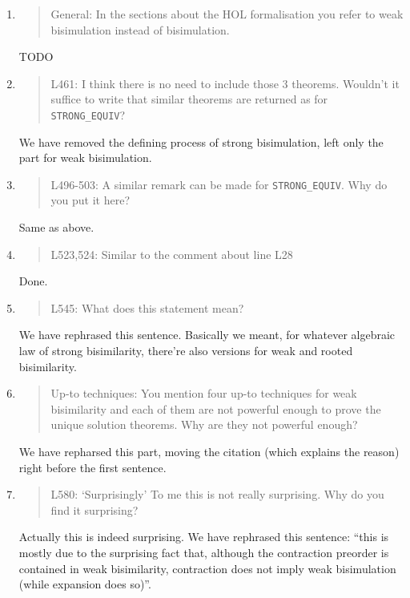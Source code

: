 \begin{enumerate}
\item \begin{quote}
    General: In the sections about the HOL formalisation you refer to
    weak bisimulation instead of bisimulation.    
  \end{quote}
  TODO
  
\item \begin{quote}
    L461: I think there is no need to include those 3
    theorems. Wouldn’t it suffice to write that similar theorems are
    returned as for \texttt{STRONG\_EQUIV}?
  \end{quote}
  We have removed the defining process of strong bisimulation, left
  only the part for weak bisimulation.
  
\item \begin{quote}
    L496-503: A similar remark can be made for \texttt{STRONG\_EQUIV}. Why do you put it here?
  \end{quote}
  Same as above.

\item \begin{quote}
    L523,524: Similar to the comment about line L28
  \end{quote}
  Done.
  
\item \begin{quote}
    L545: What does this statement mean?
  \end{quote}
  We have rephrased this sentence. Basically we meant, for whatever
  algebraic law of strong bisimilarity, there're also versions for
  weak and rooted bisimilarity.

\item \begin{quote}
    Up-to techniques: You mention four up-to techniques for weak
    bisimilarity and each of them are not powerful enough to prove the
    unique solution theorems. Why are they not powerful enough?
  \end{quote}

  We have repharsed this part, moving the citation
  \cite{sangiorgi1992problem} (which explains the reason) right before
  the first sentence.
  
\item \begin{quote}
    L580: ‘Surprisingly’ To me this is not really surprising. Why do you find it surprising?
  \end{quote}
  Actually this is indeed surprising. We have rephrased this sentence:
  ``this is mostly due to the surprising fact
  that, although the contraction preorder is contained in weak
bisimilarity, contraction does not imply weak bisimulation (while
expansion does so)''.


\end{enumerate}

